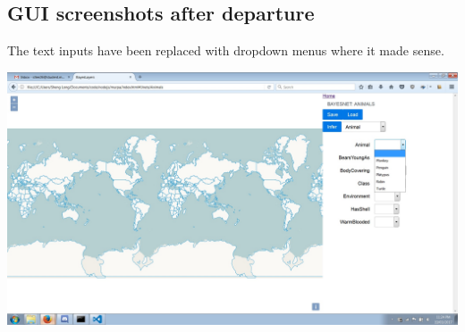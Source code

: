 \documentclass[12pt,notitlepage]{article}
\begin{document}
\subsection{GUI screenshots after departure}\label{subsec:screens1}
The text inputs have been replaced with dropdown menus where it made sense.
\begin{center}
\includegraphics[width=0.8\linewidth]{v1nodes}
\end{center}
\end{document}
